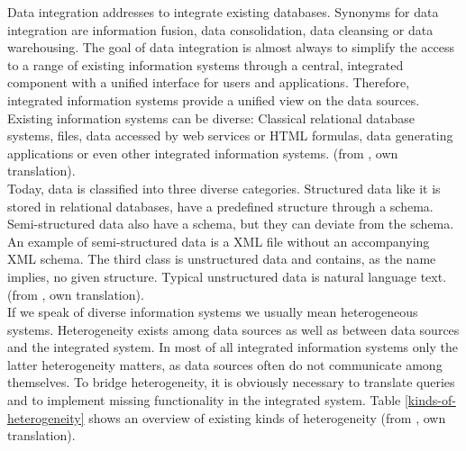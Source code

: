 Data integration addresses to integrate existing databases. Synonyms for data integration are information fusion, data consolidation, data cleansing or data warehousing. The goal of data integration is almost always to simplify the access to a range of existing information systems through a central, integrated component with a unified interface for users and applications. Therefore, integrated information systems provide a unified view on the data sources. Existing information systems can be diverse: Classical relational database systems, files, data accessed by web services or HTML formulas, data generating applications or even other integrated information systems. (from \cite[p. 3-4]{DBLP:books/dp/LeserN2006}, own translation).\\
Today, data is classified into three diverse categories. Structured data like it is stored in relational databases, have a predefined structure through a schema.
Semi-structured data also have a schema, but they can deviate from the schema. An example of semi-structured data is a XML file without an accompanying XML schema. The third class is unstructured data and contains, as the name implies, no given structure. Typical unstructured data is natural language text.
(from \cite[p. 17]{DBLP:books/dp/LeserN2006}, own translation).\\
If we speak of diverse information systems we usually mean heterogeneous systems. Heterogeneity exists among data sources as well as between data sources and the integrated system. In most of all integrated information systems only the latter heterogeneity matters, as data sources often do not communicate among themselves. 
To bridge heterogeneity, it is obviously necessary to translate queries and to implement missing functionality in the integrated system. Table \ref{kinds-of-heterogeneity} shows an overview of existing kinds of heterogeneity (from \cite[p. 60/61]{DBLP:books/dp/LeserN2006}, own translation).

